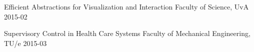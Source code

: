 \begin{multicols}{2}
         {Efficient Abstractions for Visualization and Interaction}
         {Faculty of Science, UvA}
         {2015-02}

         {Supervisory Control in Health Care Systems}
         {Faculty of Mechanical Engineering, TU/e}
         {2015-03}













\end{multicols}
